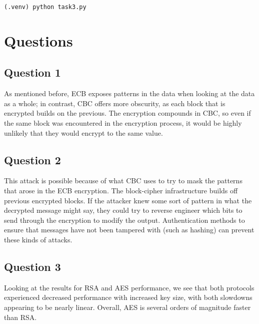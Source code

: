 \documentclass[11pt]{article}
\begin{document}
\verb|(.venv) python task3.py|

\section*{Questions}
\subsection*{Question 1}

As mentioned before, ECB exposes patterns in the data when looking at the data as a whole; in contrast, CBC offers more obscurity, as each block that is encrypted builds on the previous. The encryption compounds in CBC, so even if the same block was encountered in the encryption process, it would be highly unlikely that they would encrypt to the same value. 

\subsection*{Question 2}

This attack is possible because of what CBC uses to try to mask the patterns that arose in the ECB encryption. The block-cipher infrastructure builds off previous encrypted blocks. If the attacker knew some sort of pattern in what the decrypted message might say, they could try to reverse engineer which bits to send through the encryption to modify the output. Authentication methods to ensure that messages have not been tampered with (such as hashing) can prevent these kinds of attacks.

\subsection*{Question 3}

Looking at the results for RSA and AES performance, we see that both protocols experienced decreased performance with increased key size, with both slowdowns appearing to be nearly linear. Overall, AES is several orders of magnitude faster than RSA.
\end{document}
